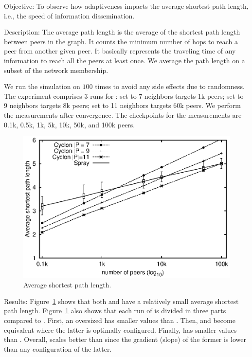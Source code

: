 \begin{asparadesc}
\item[Objective:] To observe how adaptiveness impacts the average shortest path
  length, i.e., the speed of information dissemination.
\item[Description:] The average path length is the average of the shortest path
  length between peers in the graph. It counts the minimum number of hops to
  reach a peer from another given peer. It basically represents the traveling
  time of any information to reach all the peers at least once. We average the
  path length on a subset of the network membership.

  We run the simulation on \SPRAY $100$ times to avoid any side effects due to
  randomness. The experiment comprises 3 runs for \CYCLON: \CYCLON set to 7
  neighbors targets 1k peers; \CYCLON set to 9 neighbors targets 8k peers;
  \CYCLON set to 11 neighbors targets 60k peers. We perform the measurements
  after convergence. The checkpoints for the measurements are 0.1k, 0.5k, 1k,
  5k, 10k, 50k, and 100k peers.

\begin{figure}
  \centering
  \includegraphics[width=\SCALE\textwidth]{img/avgpath.eps}
  \caption{\label{fig:avgpath}Average shortest path length.}
\end{figure}

\item[Results:] Figure~\ref{fig:avgpath} shows that both \CYCLON and \SPRAY have
  a relatively small average shortest path length.  Figure~\ref{fig:avgpath}
  also shows that each run of \CYCLON is divided in three parts compared to
  \SPRAY. First, an oversized \CYCLON has smaller values than \SPRAY. Then,
  \SPRAY and \CYCLON become equivalent where the latter is optimally
  configured. Finally, \SPRAY has smaller values than \CYCLON. Overall, \SPRAY
  scales better than \CYCLON since the gradient (slope) of the former is lower
  than any configuration of the latter.


\end{asparadesc}

